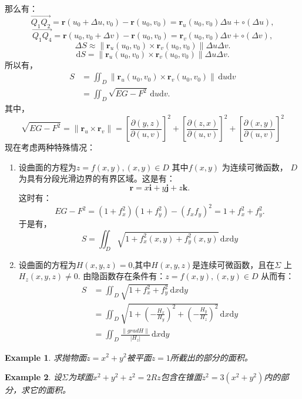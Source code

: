 \documentclass[a4paper,12pt]{article}
\newtheorem{example}{Example}             %
\begin{document}
\begin{CJK}{UTF8}{gbsn}
    那么有：
    \[
        \overrightarrow{Q_1Q_2} = \bm{r}(u_0+\Delta u, v_0) - \bm{r}(u_0,v_0)
                              = \bm{r}_u(u_0,v_0)\Delta u + \circ(\Delta u),
        \]
    \[
        \overrightarrow{Q_1Q_4} = \bm{r}(u_0, v_0+\Delta v) - \bm{r}(u_0,v_0)
                              = \bm{r}_v(u_0,v_0)\Delta v + \circ(\Delta v),
    \]
    \[
        \Delta S \approx \|\bm{r}_u(u_0,v_0) \times \bm{r}_v(u_0,v_0)\|\Delta u\Delta v.
    \]
    \[
        \mathrm{d}S = \|\bm{r}_u(u_0,v_0) \times \bm{r}_v(u_0,v_0)\|\Delta u\Delta v.
    \]
所以有，
\[
    \begin{split}
        S & = \iint_D \|\bm{r}_u(u_0,v_0) \times \bm{r}_v(u_0,v_0)\|\,\mathrm{d} u\mathrm{d} v \\
          & = \iint_D \sqrt{EG-F^2}\,\mathrm{d}u \mathrm{d}v.
    \end{split}
    \]
其中，
\[
    \sqrt{EG-F^2} = \|\bm{r}_u \times \bm{r}_v\| = \left[\frac{\partial(y,z)}{\partial(u,v)}\right]^2 + 
    \left[\frac{\partial(z,x)}{\partial(u,v)}\right]^2 + \left[\frac{\partial(x,y)}{\partial(u,v)}\right]^2 
    \]
现在考虑两种特殊情况：
\begin{enumerate}
    \item 设曲面的方程为$z = f(x,y), (x,y) \in D$ 其中$f(x,y)$ 为连续可微函数，
        $D$ 为具有分段光滑边界的有界区域。这是有：
        \[
            \bm{r} = x\bm{i} + y\bm{j} + z\bm{k}.
        \]
    这时有：
        \[
            EG - F^2 = \left(1+f_x^2\right)\left(1+f_y^2\right)-\left(f_xf_y\right)^2
            = 1+f_x^2+f_y^2.
        \]
    于是有，
        \[
            S = \iint_D \sqrt{1 + f_x^2(x,y) + f_y^2(x,y)}\, \mathrm{d}x\mathrm{d}y
        \]
\item 设曲面的方程为$H(x,y,z) = 0$,其中$H(x,y,z)$是连续可微函数，且在$\Sigma$
    上$H_z(x,y,z) \ne 0 $. 由隐函数存在条件有：$z = f(x,y), (x,y) \in D$
    从而有：
    \[
        \begin{split}
            S & = \iint_D \sqrt{1+f_x^2+f_y^2}\, \mathrm{d}x\mathrm{d}y \\
              & = \iint_D \sqrt{1+\left(-\frac{H_x}{H_y}\right)^2+\left(-\frac{H_y}{H_z}\right)^2}\, \mathrm{d}x\mathrm{d}y \\
              & = \iint_D \frac{\|grad H\|}{\left|H_z\right|}\,\mathrm{d}x\mathrm{d}y
        \end{split}
            \]
\end{enumerate}

\begin{example}
    求抛物面$z = x^2 + y^2$被平面$z = 1$所截出的部分的面积。
\end{example}
\begin{example}
    设$\Sigma$为球面$x^2+y^2+z^2 = 2Rz$包含在锥面$z^2 = 3\left(x^2+y^2\right)$内的部分，求它的面积。
\end{example}


\end{CJK}
\end{document}

